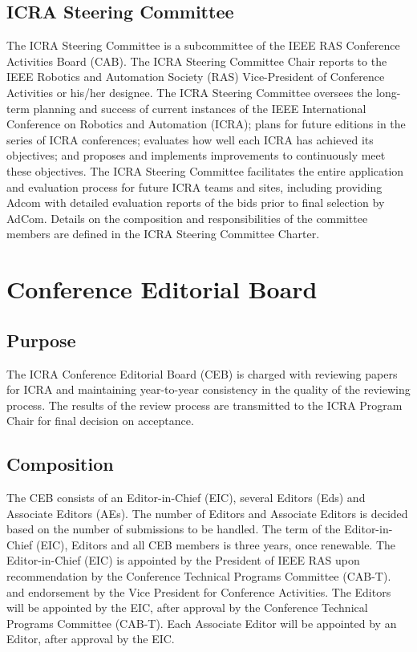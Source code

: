 \documentclass[10pt]{article}
\begin{document}
\subsection{ICRA Steering Committee}

The ICRA Steering Committee is a subcommittee of the IEEE RAS Conference Activities Board (CAB). The ICRA Steering Committee Chair reports to the IEEE Robotics and Automation Society (RAS) Vice-President of Conference Activities or his/her designee. The ICRA Steering Committee oversees the long-term planning and success of current instances of the IEEE International Conference on Robotics and Automation (ICRA); plans for future editions in the series of ICRA conferences; evaluates how well each ICRA has achieved its objectives; and proposes and implements improvements to continuously meet these objectives. The ICRA Steering Committee facilitates the entire application and evaluation process for future ICRA teams and sites, including providing Adcom with detailed evaluation reports of the bids prior to final selection by AdCom. Details on the composition and responsibilities of the committee members are defined in the ICRA Steering Committee Charter.

\section{Conference Editorial Board}
\label{CEB}

\subsection{Purpose}

The ICRA Conference Editorial Board (CEB) is charged with reviewing papers for ICRA and maintaining year-to-year consistency in the quality of the reviewing process. The results of the review process are transmitted to the ICRA Program Chair for final decision on acceptance. 


\subsection{Composition}

The CEB consists of an Editor-in-Chief (EIC), several Editors (Eds) and Associate Editors (AEs). The number of Editors and Associate Editors is decided based on the number of submissions to be handled. The term of the Editor-in-Chief (EIC), Editors and all CEB members is three years, once renewable. The Editor-in-Chief (EIC) is appointed by the President of IEEE RAS upon recommendation by the Conference Technical Programs Committee (CAB-T). and endorsement by the Vice President for Conference Activities. The Editors will be appointed by the EIC, after approval by the Conference Technical Programs Committee (CAB-T). Each Associate Editor will be appointed by an Editor, after approval by the EIC.
\end{document}
